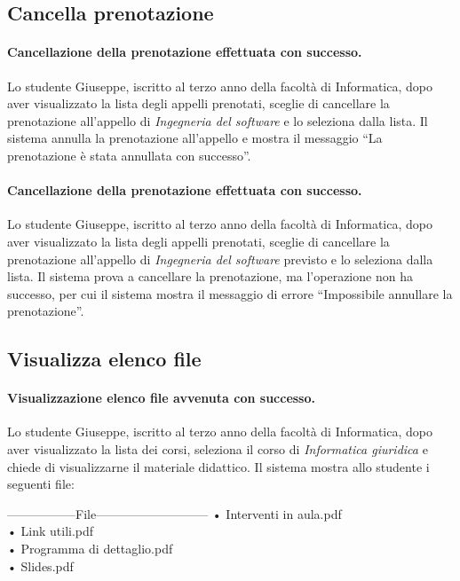 
\subsection{Cancella prenotazione}
\paragraph{Cancellazione della prenotazione effettuata con successo.}
Lo studente Giuseppe, iscritto al terzo anno della facoltà di Informatica, dopo aver visualizzato la lista degli appelli prenotati, sceglie di cancellare la prenotazione all’appello di \textit{Ingegneria del software} e lo seleziona dalla lista. Il sistema annulla la prenotazione all’appello e mostra il messaggio “La prenotazione è stata annullata con successo”.

\paragraph{Cancellazione della prenotazione effettuata con successo.}
Lo studente Giuseppe, iscritto al terzo anno della facoltà di Informatica, dopo aver visualizzato la lista degli appelli prenotati, sceglie di cancellare la prenotazione all’appello di \textit{Ingegneria del software} previsto e lo seleziona dalla lista. Il sistema prova a cancellare la prenotazione, ma l’operazione non ha successo, per cui il sistema mostra il messaggio di errore “Impossibile annullare la prenotazione”.

\subsection{Visualizza elenco file}
\paragraph{Visualizzazione elenco file avvenuta con successo.}
Lo studente Giuseppe, iscritto al terzo anno della facoltà di Informatica, dopo aver visualizzato la lista dei corsi, seleziona il corso di \textit{Informatica giuridica} e chiede di visualizzarne il materiale didattico. Il sistema mostra allo studente i seguenti file: 

\begin{tabbing}
	\hspace{1cm}-----------------File---------------------------\kill
	\hspace{1cm} • Interventi in aula.pdf  \\
	\hspace{1cm} • Link utili.pdf  \\
	\hspace{1cm} • Programma di dettaglio.pdf  \\	
	\hspace{1cm} • Slides.pdf  \\
\end{tabbing} 


